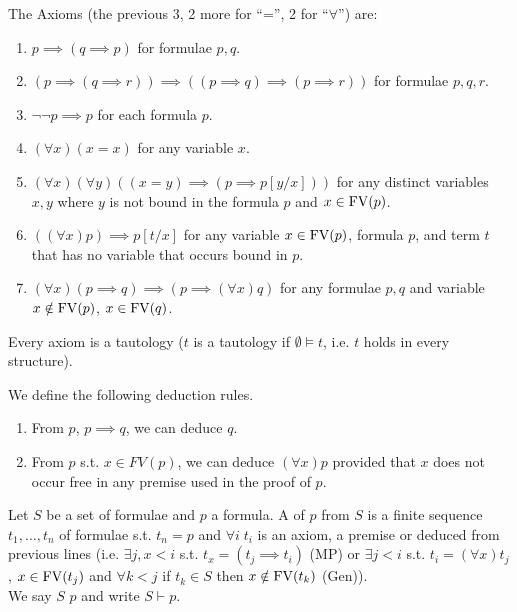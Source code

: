 The Axioms (the previous 3, 2 more for ``='', 2 for ``$\forall$'') are:
\begin{enumerate}
    \item $p \implies (q \implies p)$ for formulae $p, q$.
    \item $(p \implies (q \implies r)) \implies ((p \implies q) \implies (p \implies r))$ for formulae $p, q, r$.
    \item $\neg\neg p \implies p$ for each formula $p$.
    \item $(\forall x)(x = x)$ for any variable $x$.
    \item $(\forall x)(\forall y)((x = y) \implies (p \implies p[y/x]))$ for any distinct variables $x, y$ where $y$ is not bound in the formula $p$ and $x \in \operatorname{FV}(p)$.
    \item $((\forall x)p) \implies p[t/x]$ for any variable $x \in \operatorname{FV}(p)$, formula $p$, and term $t$ that has no variable that occurs bound in $p$.
    \item $(\forall x)(p \implies q) \implies (p \implies (\forall x)q)$ for any formulae $p, q$ and variable $x \notin \operatorname{FV}(p)$, $x \in \operatorname{FV}(q)$.
\end{enumerate}

\begin{note}
    Every axiom is a tautology ($t$ is a tautology if $\emptyset \models t$, i.e. $t$ holds in every structure).
\end{note}

We define the following deduction rules.
\begin{enumerate}
    \item {} From $p$, $p \implies q$, we can deduce $q$.
    \item {} From $p$ s.t. $x \in FV(p)$, we can deduce $(\forall x)p$ provided that $x$ does not occur free in any premise used in the proof of $p$.
\end{enumerate}

\begin{definition}[Proof]
    Let $S$ be a set of formulae and $p$ a formula.
    A  of $p$ from $S$ is a finite sequence $t_1, \dots, t_n$ of formulae s.t. $t_n = p$ and $\forall i \; t_i$ is an axiom, a premise or deduced from previous lines (i.e. $\exists j, x < i$ s.t. $t_x = (t_j \implies t_i)$ (MP) or $\exists j < i$ s.t. $t_i = (\forall x)t_j$, $x \in \operatorname{FV}(t_j)$ and $\forall k < j$ if $t_k \in S$ then $x \notin \operatorname{FV}(t_k)$ (Gen)). \\
    We say $S$  $p$ and write $S \vdash p$.
\end{definition}

